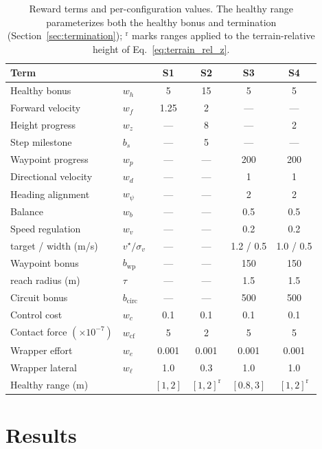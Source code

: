 \documentclass[conference,a4paper]{IEEEtran}
\begin{document}
\begin{table}[t]
\caption{Reward terms and per-configuration values. The healthy range parameterizes both the healthy bonus and termination (Section~\ref{sec:termination}); $^{\mathrm{r}}$ marks ranges applied to the terrain-relative height of Eq.~\eqref{eq:terrain_rel_z}.}
\label{tab:reward_terms}
\centering
\footnotesize
\setlength{\tabcolsep}{3pt}
\begin{tabular}{@{}llcccc@{}}
\toprule
\textbf{Term} & & \textbf{S1} & \textbf{S2} & \textbf{S3} & \textbf{S4} \\
\midrule
Healthy bonus & $w_h$ & 5 & 15 & 5 & 5 \\
Forward velocity & $w_f$ & 1.25 & 2 & --- & --- \\
Height progress & $w_z$ & --- & 8 & --- & 2 \\
Step milestone & $b_s$ & --- & 5 & --- & --- \\
Waypoint progress & $w_p$ & --- & --- & 200 & 200 \\
Directional velocity & $w_d$ & --- & --- & 1 & 1 \\
Heading alignment & $w_\psi$ & --- & --- & 2 & 2 \\
Balance & $w_b$ & --- & --- & 0.5 & 0.5 \\
Speed regulation & $w_v$ & --- & --- & 0.2 & 0.2 \\
\quad target / width (m/s) & $v^\star / \sigma_v$ & --- & --- & 1.2 / 0.5 & 1.0 / 0.5 \\
Waypoint bonus & $b_{\mathrm{wp}}$ & --- & --- & 150 & 150 \\
\quad reach radius (m) & $\tau$ & --- & --- & 1.5 & 1.5 \\
Circuit bonus & $b_{\mathrm{circ}}$ & --- & --- & 500 & 500 \\
\midrule
Control cost & $w_c$ & 0.1 & 0.1 & 0.1 & 0.1 \\
Contact force $({\times}10^{-7})$ & $w_{\mathrm{cf}}$ & 5 & 2 & 5 & 5 \\
Wrapper effort & $w_e$ & 0.001 & 0.001 & 0.001 & 0.001 \\
Wrapper lateral & $w_\ell$ & 1.0 & 0.3 & 1.0 & 1.0 \\
\midrule
Healthy range (m) & & $[1, 2]$ & $[1, 2]^{\mathrm{r}}$ & $[0.8, 3]$ & $[1, 2]^{\mathrm{r}}$ \\
\bottomrule
\end{tabular}
\end{table}

\section{Results}
\label{sec:results}
\end{document}
